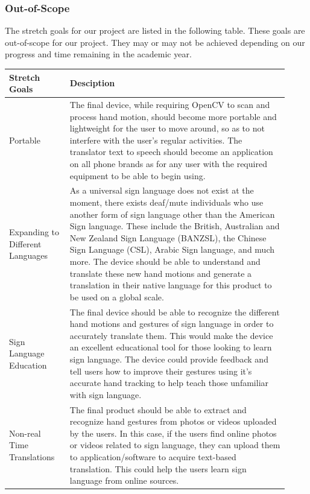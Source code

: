\documentclass[12pt]{article}
\begin{document}
\subsubsection{Out-of-Scope}
\indent The stretch goals for our project are listed in the following table. These goals are out-of-scope for our 
project. They may or may not be achieved depending on our progress and time remaining in the academic year.

\renewcommand{\arraystretch}{1.2}
\noindent \begin{tabularx}{\textwidth}{p{0.2\linewidth}|p{0.72\linewidth}}
\toprule
\textbf{Stretch Goals} & \textbf{Desciption}\\
\midrule
Portable
& The final device, while requiring OpenCV to scan and process hand motion, should become more portable and lightweight 
for the user to move around, so as to not interfere with the user’s regular activities. The translator text to speech 
should become an application on all phone brands as for any user with the required equipment to be able to begin using.\\
\hline
Expanding to Different Languages
& As a universal sign language does not exist at the moment, there exists deaf/mute individuals who use another form of 
sign language other than the American Sign language. These include the British, Australian and New Zealand Sign Language (BANZSL),
the Chinese Sign Language (CSL), Arabic Sign language, and much more. The device should be able to understand and translate these 
new hand motions and generate a translation in their native language for this product to be used on a global scale.\\
\hline
Sign Language Education
& The final device should be able to recognize the different hand motions and gestures of sign language in order to accurately
translate them. This would make the device an excellent educational tool for those looking to learn sign language. The device 
could provide feedback and tell users how to improve their gestures using it’s accurate hand tracking to help teach those unfamiliar 
with sign language.\\
\hline
Non-real Time Translations
& The final product should be able to extract and recognize hand gestures from photos or videos uploaded by the users. 
In this case, if the users find online photos or videos related to sign language, they can upload them to application/software
to acquire text-based translation. This could help the users learn sign language from online sources.\\
\bottomrule
\end{tabularx}
\end{document}
